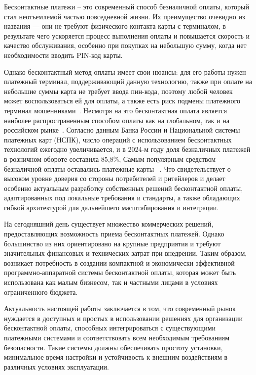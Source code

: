 \newpage


Бесконтактные платежи – это современный способ безналичной оплаты, который стал неотъемлемой частью повседневной жизни.
Их преимущество очевидно из названия --- они не требуют физического контакта карты с терминалом, в результате чего ускоряется процесс выполнения оплаты и повышается скорость и качество обслуживания, особенно при покупках на небольшую сумму, когда нет необходимости вводить PIN-код карты.

Однако бесконтактный метод оплаты имеет свои нюансы: для его работы нужен платежный терминал, поддерживающий данную технологию, также при оплате на небольшие суммы карта не требует ввода пин-кода, поэтому любой человек может воспользоваться ей для оплаты, а также есть риск подмены платежного терминал мошенниками~\cite{codejournal}.
Несмотря на это бесконтактная оплата является наиболее распространенным способом оплаты как на глобальном, так и на российском рынке~\cite{posterminals}.
Согласно данным Банка России и Национальной системы платежных карт (НСПК), число операций с использованием бесконтактных технологий ежегодно увеличивается, и в 2024-м году доля безналичных платежей в розничном обороте составила 85,8\%,
Самым популярным средством безналичной оплаты оставались платежные карты
~\cite{cdrf_report2024}\cite{cdrf_results2024}.
Что свидетельствует о высоком уровне доверия со стороны потребителей и ритейлеров и делает особенно актуальным разработку собственных решений бесконтактной оплаты, адаптированных под локальные требования и стандарты, а также обладающих гибкой архитектурой для дальнейшего масштабирования и интеграции.

На сегодняшний день существует множество коммерческих решений, предоставляющих возможность приема бесконтактных платежей.
Однако большинство из них ориентировано на крупные предприятия и требуют значительных финансовых и технических затрат при внедрении.
Таким образом, возникает потребность в создании компактной и экономически эффективной программно-аппаратной системы бесконтактной оплаты, которая может быть использована как малым бизнесом, так и частными лицами в условиях ограниченного бюджета.


Актуальность настоящей работы заключается в том, что современный рынок нуждается в доступных и простых в использовании решениях для организации бесконтактной оплаты, способных интегрироваться с существующими платежными системами и соответствовать всем необходимым требованиям безопасности.
Такие системы должны обеспечивать простоту установки, минимальное время настройки и устойчивость к внешним воздействиям в различных условиях эксплуатации.


